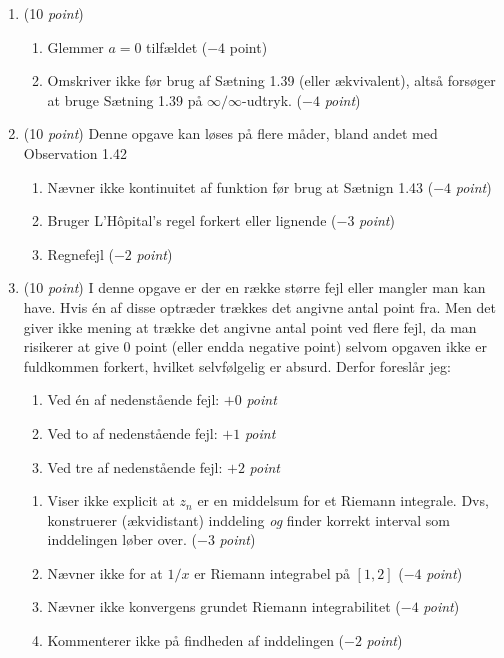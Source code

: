\documentclass{article}
\begin{document}
\begin{opg}\hfill
	\begin{enumerate}
		\item (10 \emph{point}) \begin{enumerate}[label=(\roman*)]
			\item Glemmer $ a=0 $ tilfældet ($ -4 $ point)
			\item Omskriver ikke før brug af Sætning 1.39 (eller ækvivalent), altså forsøger at bruge Sætning 1.39 på $ \infty/\infty $-udtryk. ($ -4 $ \emph{point})
		\end{enumerate}
		\item (10 \emph{point}) Denne opgave kan løses på flere måder, bland andet med Observation 1.42 \begin{enumerate}[label=(\roman*)]
			\item Nævner ikke kontinuitet af funktion før brug at Sætnign 1.43 ($ -4 $ \emph{point})
			\item Bruger L'H\^opital's regel forkert eller lignende ($ -3 $ \emph{point})
			\item Regnefejl ($ -2 $ \emph{point})
			
		\end{enumerate}
		\item (10 \emph{point}) I denne opgave er der en række større fejl eller mangler man kan have. Hvis én af disse optræder trækkes det angivne antal point fra. Men det giver ikke mening at trække det angivne antal point ved flere fejl, da man risikerer at give $ 0 $ point (eller endda negative point) selvom opgaven ikke er fuldkommen forkert, hvilket selvfølgelig er absurd. Derfor foreslår jeg:
		\begin{enumerate}[label=(\Roman*)]
			\item Ved én af nedenstående fejl: $ +0 $ \emph{point}
			\item Ved to af nedenstående fejl: $ +1 $ \emph{point}
			\item Ved tre af nedenstående fejl: $ +2 $ \emph{point}
		\end{enumerate}
		\begin{enumerate}[label=(\roman*)]
			\item Viser ikke explicit at $ z_n $ er en middelsum for et Riemann integrale. Dvs, konstruerer (ækvidistant) inddeling \emph{og} finder korrekt interval som inddelingen løber over. ($ -3 $ \emph{point}) 
			\item Nævner ikke for at $ 1/x $ er Riemann integrabel på $ [1,2] $ ($ -4 $ \emph{point})
			\item Nævner ikke konvergens grundet Riemann integrabilitet ($ -4 $ \emph{point})
			\item Kommenterer ikke på findheden af inddelingen ($ -2 $ \emph{point})
		\end{enumerate}
	\end{enumerate}
\end{opg}
\end{document}

